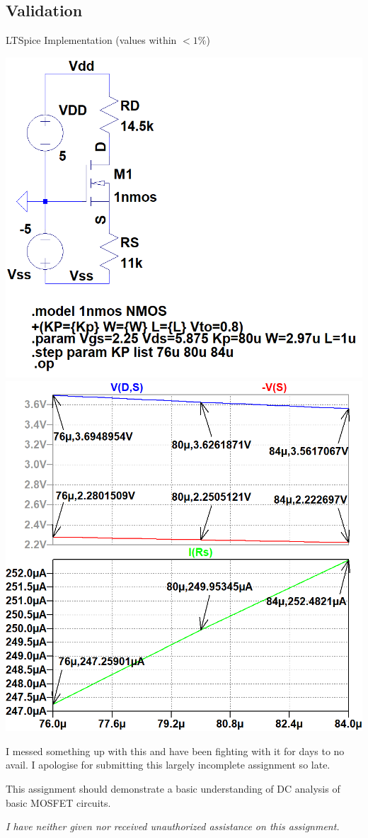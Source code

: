 \documentclass[12pt,letterpaper,titlepage]{article}
\begin{document}
\begin{raggedright}
\clearpage
\subsection{Validation}

\begin{center}
LTSpice Implementation (values within $<1\%$)

\includegraphics[width=.5\textwidth, height=\textheight, keepaspectratio=true]{ds1b}
\includegraphics[width=.48\textwidth, height=\textheight, keepaspectratio=true]{ds1c}
\end{center}

I messed something up with this and have been fighting with it for days to no avail. I apologise for submitting this largely incomplete assignment so late.

This assignment should demonstrate a basic understanding of DC analysis of basic MOSFET circuits.

\textit{I have neither given nor received unauthorized assistance on this assignment.}


\end{raggedright}
\end{document}
